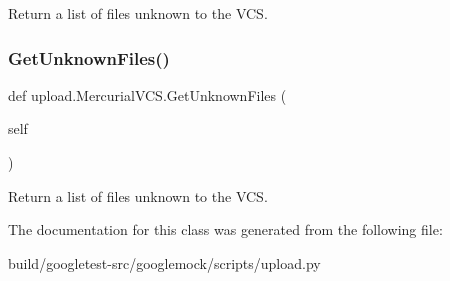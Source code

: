 \begin{DoxyVerb}Return a list of files unknown to the VCS.\end{DoxyVerb}
 \mbox{\label{classupload_1_1MercurialVCS_a6190899fb86cd09ad84cc5d4b0ebd2f3}} 
\subsubsection{\texorpdfstring{Get\+Unknown\+Files()}{GetUnknownFiles()}\hspace{0.1cm}{\footnotesize\ttfamily [2/2]}}
{\footnotesize\ttfamily def upload.\+Mercurial\+V\+C\+S.\+Get\+Unknown\+Files (\begin{DoxyParamCaption}\item[{}]{self }\end{DoxyParamCaption})}

\begin{DoxyVerb}Return a list of files unknown to the VCS.\end{DoxyVerb}
 

The documentation for this class was generated from the following file\+:\begin{DoxyCompactItemize}
\item 
build/googletest-\/src/googlemock/scripts/upload.\+py\end{DoxyCompactItemize}
